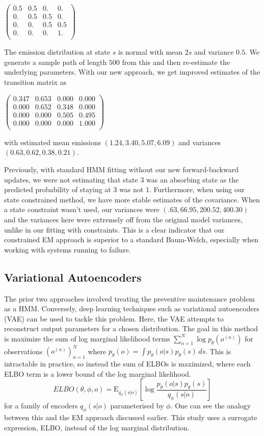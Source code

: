 \documentclass[english]{article}
\numberwithin{equation}{section}
\newcommand{\E}{\mathrm{E}}
\begin{document}
	$\left(
	\begin{array}{cccc}
	0.5 & 0.5 & 0. & 0. \\
	0. & 0.5 & 0.5 & 0. \\
	0. & 0. & 0.5 & 0.5 \\
	0. & 0. & 0. & 1. \\
	\end{array}
	\right)$

	The emission distribution at state $s$ is normal with mean $2s$ and variance $0.5$. We generate a sample path of length $500$ from this and then re-estimate the underlying parameters. With our new approach, we get improved estimates of the transition matrix as

	$\left(
	\begin{array}{cccc}
	0.347 & 0.653 & 0.000 & 0.000 \\ 
	0.000 & 0.652 & 0.348 & 0.000 \\ 
	0.000 & 0.000 & 0.505 & 0.495 \\ 
	0.000 & 0.000 & 0.000 & 1.000 \\ 
	\end{array} \right)$
	
	with estimated mean emissions $(1.24,3.40,5.07,6.09)$ and variances $(0.63,0.62,0.38,0.21)$.
	
Previously, with standard HMM fitting without our new forward-backward updates, we were not estimating that state $3$ was an absorbing state as the predicted probability of staying at $3$ was not $1$. Furthermore, when using our state constrained method, we have more stable estimates of the covariance. When a state constraint wasn't used, our variances were $(.63, 66.95, 200.52, 400.30)$ and the variances here were extremely off from the original model variances, unlike in our fitting with constraints. This is a clear indicator that our constrained EM approach is superior to a standard Baum-Welch, especially when working with systems running to failure.

\subsection*{Variational Autoencoders}
	The prior two approaches involved treating the preventive maintenance problem as a HMM. Conversely, deep learning techniques such as variational autoencoders (VAE) can be used to tackle this problem. Here, the VAE attempts to reconstruct output parameters for a chosen distribution. The goal in this method is maximize the sum of log marginal likelihood terms $\sum_{n=1}^N \log p_{\theta}(o^{(n)})$ for observations $(o^{(n)})_{n=1}^N$ where $p_{\theta}(o)=\int p_{\theta}(o|s)p_{\theta}(s)\,ds.$ This is intractable in practice, so instead the sum of ELBOs is maximized, where each ELBO term is a lower bound of the log marginal likelihood.
	$$ELBO(\theta,\phi,o)=\E_{q_{\phi}(s|o)}[\log \frac{p_{\theta}(o|s)p_{\theta}(s)}{q_{\phi}(s|o)}]$$ for a family of encoders $q_{\phi}(s|o)$ parameterised by $\phi$. One can see the analogy between this and the EM approach discussed earlier. This study uses a surrogate expression, ELBO, instead of the log marginal distribution. 
	
\end{document}
